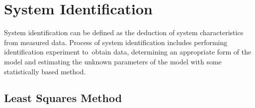 \chapter{System Identification}

System identification can be defined as the deduction of system characteristics from measured data. \cite{NASA-RP-1138} Process of system identification includes performing identification experiment to obtain data, determining an appropriate form of the model and estimating the unknown parameters of the model with some statistically based method. \cite{SoderstromStoica1989}

\section{Least Squares Method}

